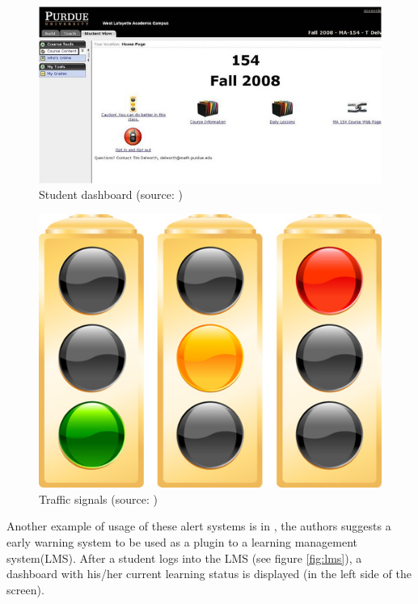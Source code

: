 \begin{figure}[htb]
	\centering
  	\includegraphics[scale=1]{Imagens/signals1.jpg}
  	\caption{Student dashboard (source: \cite{arnold2010signals})}
  	\label{fig:s1}
\end{figure}

\begin{figure}[htb]
	\centering
  	\includegraphics[scale=.3]{Imagens/signals2.jpg}
  	\caption{Traffic signals (source: \cite{arnold2010signals})}
  	\label{fig:s2}
\end{figure}

Another example of usage of these alert systems is in \cite{shi2014developing}, the authors suggests a early warning system to be used as a plugin to a learning management system(LMS). After a student logs into the LMS (see figure \ref{fig:lms}), a dashboard with his/her current learning status is displayed (in the left side of the screen).

